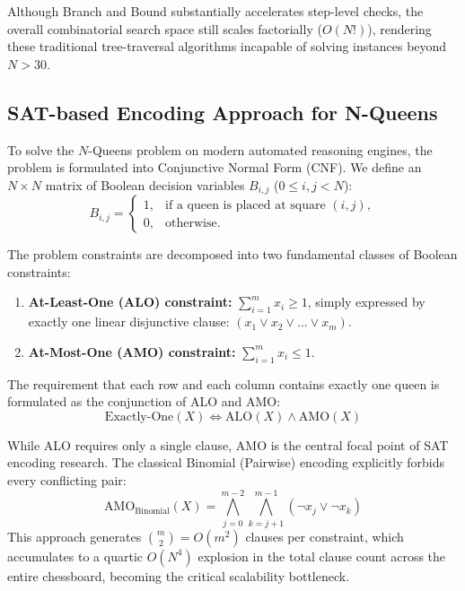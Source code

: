 \documentclass[a4paper,fleqn]{cas-sc}
\begin{document}
Although Branch and Bound substantially accelerates step-level checks, the overall combinatorial search space still scales factorially ($O(N!)$), rendering these traditional tree-traversal algorithms incapable of solving instances beyond $N > 30$.

\subsection{SAT-based Encoding Approach for N-Queens}
\label{subsec:sat_encoding_intro}
To solve the $N$-Queens problem on modern automated reasoning engines, the problem is formulated into Conjunctive Normal Form (CNF). We define an $N \times N$ matrix of Boolean decision variables $B_{i,j}$ ($0 \le i, j < N$):
\begin{equation}
B_{i,j} = \begin{cases}
1, & \text{if a queen is placed at square } (i, j), \\
0, & \text{otherwise.}
\end{cases}
\end{equation}

The problem constraints are decomposed into two fundamental classes of Boolean constraints:
\begin{enumerate}
    \item \textbf{At-Least-One (ALO) constraint:} $\sum_{i=1}^m x_i \ge 1$, simply expressed by exactly one linear disjunctive clause: $(x_1 \lor x_2 \lor \dots \lor x_m)$.
    \item \textbf{At-Most-One (AMO) constraint:} $\sum_{i=1}^m x_i \le 1$.
\end{enumerate}

The requirement that each row and each column contains exactly one queen is formulated as the conjunction of ALO and AMO:
\begin{equation}
\text{Exactly-One}(X) \iff \text{ALO}(X) \land \text{AMO}(X)
\end{equation}

While ALO requires only a single clause, AMO is the central focal point of SAT encoding research. The classical Binomial (Pairwise) encoding explicitly forbids every conflicting pair:
\begin{equation}
\text{AMO}_{\text{Binomial}}(X) = \bigwedge_{j=0}^{m-2} \bigwedge_{k=j+1}^{m-1} (\neg x_j \lor \neg x_k)
\end{equation}
This approach generates $\binom{m}{2} = O(m^2)$ clauses per constraint, which accumulates to a quartic $O(N^4)$ explosion in the total clause count across the entire chessboard, becoming the critical scalability bottleneck.
\end{document}
